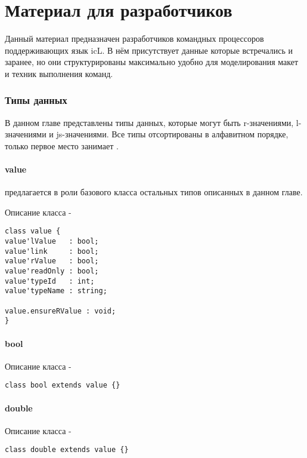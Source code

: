 \documentclass[a4paper, 14pt]{extarticle}
\begin{document}
\newpage
\part{Материал для разработчиков}

Данный материал предназначен разработчиков командных процессоров поддерживающих язык icL. В нём присутствует данные которые встречались и заранее, но они структурированы максимально удобно для моделирования макет и техник выполнения команд.

\section{Типы данных}

В данном главе представлены типы данных, которые могут быть r-значениями, l-значениями и js-значениями. Все типы отсортированы в алфавитном порядке, только первое место занимает .

\subsection{{\color{lightblue} value}}

 предлагается в роли базового класса остальных типов описанных в данном главе.

Описание класса  -
\begin{lstlisting}[numbers=none]
class value {
value'lValue   : bool;
value'link     : bool;
value'rValue   : bool;
value'readOnly : bool;
value'typeId   : int;
value'typeName : string;

value.ensureRValue : void;
}
\end{lstlisting}

\subsection{{\color{lightblue} bool}}

Описание класса \bool -
\begin{lstlisting}[numbers=none]
class bool extends value {}
\end{lstlisting}

\subsection{{\color{lightblue} double}}

Описание класса \double -
\begin{lstlisting}[numbers=none]
class double extends value {}
\end{lstlisting}
\end{document}
